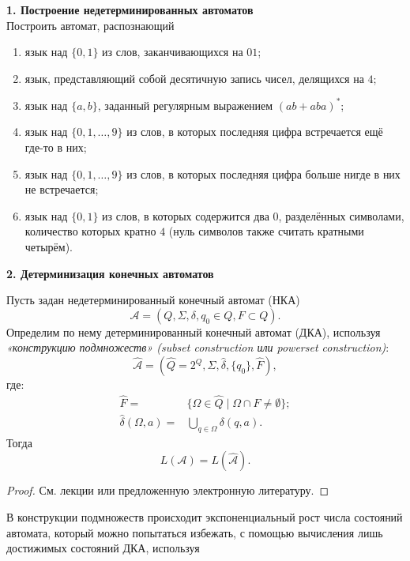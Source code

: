 \twocolumn[\begin{center}
{\bfseries\Large \textsc{\Llabel{} \Lnum}}
\end{center}]

\textbf{1. Построение недетерминированных автоматов}\\
Построить автомат, распознающий 
\begin{enumerate}
  \item язык над $\{0,1\}$ из слов, заканчивающихся на $01$;
  \item язык, представляющий собой десятичную запись чисел, делящихся на $4$;
  \item язык над $\{a, b\}$, заданный регулярным выражением $(ab + aba)^\ast$; 
  \item язык над $\{0, 1, \ldots , 9\}$ из слов, в которых последняя цифра
  встречается ещё где-то в них;
  \item язык над $\{0, 1, \ldots , 9\}$ из слов, в которых последняя цифра
  больше нигде в них не встречается;
  \item язык над $\{0,1\}$ из слов, в которых содержится два $0$, разделённых
  символами, количество которых кратно $4$ (нуль символов также считать
  кратными четырём).
\end{enumerate}
\pagebreak

\textbf{2. Детерминизация конечных автоматов}
\begin{Thm}
Пусть задан недетерминированный конечный автомат (НКА) $$\mathcal A = (Q,
\Sigma, \delta, q_0 \in Q, F \subset Q).$$ Определим по нему детерминированный
конечный автомат (ДКА), используя \emph{«конструкцию подмножеств» (subset 
construction или powerset construction)}:
$$\widehat{\mathcal A} = (\widehat Q = 2^Q, \Sigma, \hat\delta, \{q_0\}, 
\widehat F),$$
где:
\begin{align*} 
\widehat F = &\{ \Omega \in \widehat Q \mid \Omega \cap F \neq \emptyset
\};\\
\hat\delta(\Omega, a) = &\bigcup_{q\in\Omega} \delta(q,a).
\end{align*}
Тогда
$$L(\mathcal A) = L(\widehat{\mathcal A}).$$
\end{Thm}
\begin{proof}См. лекции или предложенную электронную литературу.
\end{proof}

В конструкции подмножеств происходит экспоненциальный рост числа состояний
автомата, который можно попытаться избежать, с помощью вычисления
лишь достижимых состояний ДКА, используя

